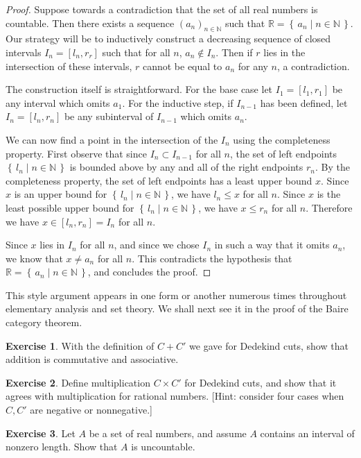 \documentclass[11pt,oneside]{amsbook}
\newcommand{\set}[1]{\left\{\,#1\,\right\}}
\newcommand{\N}{\mathbb N}
\newcommand{\R}{\mathbb R}
\theoremstyle{definition}
\newtheorem{exercise}{Exercise}[section]
\theoremstyle{plain}
\theoremstyle{definition}
\theoremstyle{remark}
\numberwithin{equation}{section}
\numberwithin{figure}{section}
\begin{document}
\begin{proof}
  Suppose towards a contradiction that the set of all real numbers is countable. Then there exists a sequence $(a_n)_{n\in\N}$ such that $\R=\set{a_n\mid n\in\N}$. Our strategy will be to inductively construct a decreasing sequence of closed intervals $I_n=[l_n,r_r]$ such that for all $n$, $a_n\notin I_n$. Then if $r$ lies in the intersection of these intervals, $r$ cannot be equal to $a_n$ for any $n$, a contradiction.

The construction itself is straightforward. For the base case let $I_1=[l_1,r_1]$ be any interval which omits $a_1$. For the inductive step, if $I_{n-1}$ has been defined, let $I_n=[l_n,r_n]$ be any subinterval of $I_{n-1}$ which omits $a_n$.

We can now find a point in the intersection of the $I_n$ using the completeness property. First observe that since $I_n\subset I_{n-1}$ for all $n$, the set of left endpoints $\set{l_n\mid n\in\N}$ is bounded above by any and all of the right endpoints $r_n$. By the completeness property, the set of left endpoints has a least upper bound $x$. Since $x$ is an upper bound for $\set{l_n\mid n\in\N}$, we have $l_n\leq x$ for all $n$. Since $x$ is the least possible upper bound for $\set{l_n\mid n\in\N}$, we have $x\leq r_n$ for all $n$. Therefore we have $x\in[l_n,r_n]=I_n$ for all $n$.

Since $x$ lies in $I_n$ for all $n$, and since we chose $I_n$ in such a way that it omits $a_n$, we know that $x\neq a_n$ for all $n$. This contradicts the hypothesis that $\R=\set{a_n\mid n\in\N}$, and concludes the proof.
\end{proof}

This style argument appears in one form or another numerous times throughout elementary analysis and set theory. We shall next see it in the proof of the Baire category theorem.

\begin{exercise}
  With the definition of $C+C'$ we gave for Dedekind cuts, show that addition is commutative and associative.
\end{exercise}

\begin{exercise}
  Define multiplication $C\times C'$ for Dedekind cuts, and show that it agrees with multiplication for rational numbers. [Hint: consider four cases when $C,C'$ are negative or nonnegative.]
\end{exercise}

\begin{exercise}
  Let $A$ be a set of real numbers, and assume $A$ contains an interval of nonzero length. Show that $A$ is uncountable.
\end{exercise}
\end{document}

